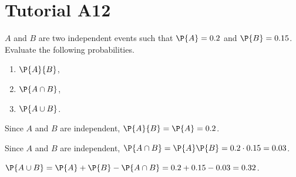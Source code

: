 \section{Tutorial A12}

\begin{problem}
    $A$ and $B$ are two independent events such that $\P{A} = 0.2$ and $\P{B} = 0.15$. Evaluate the following probabilities.
    \begin{enumerate}
        \item $\P{A}{B}$,
        \item $\P{A \cap B}$,
        \item $\P{A \cup B}$.
    \end{enumerate}
\end{problem}
\begin{solution}
    \begin{ppart}
        Since $A$ and $B$ are independent, $\P{A}{B} = \P{A} = 0.2$.
    \end{ppart}
    \begin{ppart}
        Since $A$ and $B$ are independent, $\P{A \cap B} = \P{A}\P{B} = 0.2 \cdot 0.15 = 0.03$.
    \end{ppart}
    \begin{ppart}
        $\P{A \cup B} = \P{A} + \P{B} - \P{A \cap B} = 0.2 + 0.15 - 0.03 = 0.32$.
    \end{ppart}
\end{solution}


